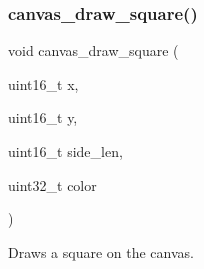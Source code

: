 \subsubsection{\texorpdfstring{canvas\+\_\+draw\+\_\+square()}{canvas\_draw\_square()}}
{\footnotesize\ttfamily void canvas\+\_\+draw\+\_\+square (\begin{DoxyParamCaption}\item[{uint16\+\_\+t}]{x,  }\item[{uint16\+\_\+t}]{y,  }\item[{uint16\+\_\+t}]{side\+\_\+len,  }\item[{uint32\+\_\+t}]{color }\end{DoxyParamCaption})}



Draws a square on the canvas. 


